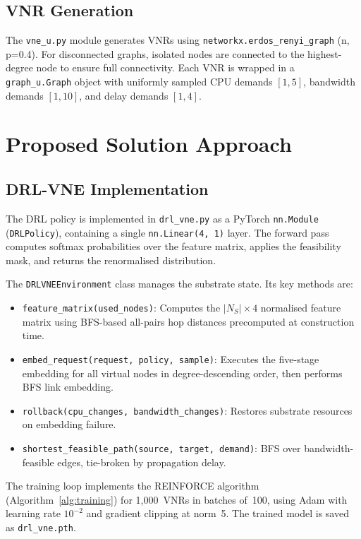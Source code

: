 \documentclass[12pt,a4paper]{report}
\begin{document}
\subsection{VNR Generation}

The \texttt{vne\_u.py} module generates VNRs using \texttt{networkx.erdos\_renyi\_graph}
(n, p=0.4). For disconnected graphs, isolated nodes are connected to the highest-degree node
to ensure full connectivity. Each VNR is wrapped in a \texttt{graph\_u.Graph} object with
uniformly sampled CPU demands $[1,5]$, bandwidth demands $[1,10]$, and delay demands $[1,4]$.

\section{Proposed Solution Approach}

\subsection{DRL-VNE Implementation}

The DRL policy is implemented in \texttt{drl\_vne.py} as a PyTorch \texttt{nn.Module}
(\texttt{DRLPolicy}), containing a single \texttt{nn.Linear(4,~1)} layer. The forward pass
computes softmax probabilities over the feature matrix, applies the feasibility mask, and
returns the renormalised distribution.

The \texttt{DRLVNEEnvironment} class manages the substrate state. Its key methods are:
\begin{itemize}[leftmargin=*]
  \item \texttt{feature\_matrix(used\_nodes)}: Computes the $|N_S|\times 4$ normalised feature
        matrix using BFS-based all-pairs hop distances precomputed at construction time.
  \item \texttt{embed\_request(request, policy, sample)}: Executes the five-stage embedding for
        all virtual nodes in degree-descending order, then performs BFS link embedding.
  \item \texttt{rollback(cpu\_changes, bandwidth\_changes)}: Restores substrate resources on
        embedding failure.
  \item \texttt{shortest\_feasible\_path(source, target, demand)}: BFS over bandwidth-feasible
        edges, tie-broken by propagation delay.
\end{itemize}

The training loop implements the REINFORCE algorithm (Algorithm~\ref{alg:training}) for
1,000~VNRs in batches of~100, using Adam with learning rate $10^{-2}$ and gradient clipping
at norm~5. The trained model is saved as \texttt{drl\_vne.pth}.
\end{document}
